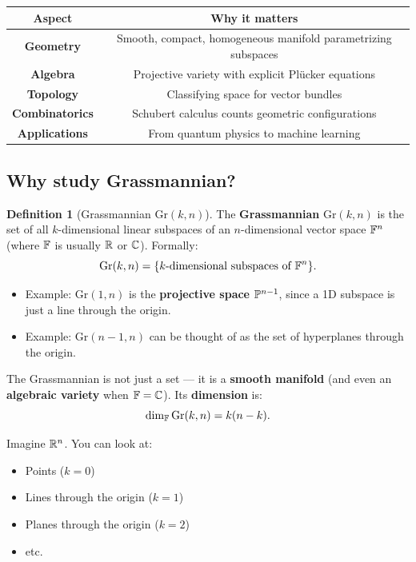 \documentclass{amsart}
\let\originalmathbb\mathbb
\renewcommand{\mathbb}[1]{%
    \ifstrequal{#1}{1}{\mathbbm{#1}}{\originalmathbb{#1}}%
}
\theoremstyle{plain}
\theoremstyle{definition}
\newtheorem{definition}[theorem]{Definition}
\theoremstyle{remark}
\begin{document}
\begin{table}[h]
	\centering
	\begin{tabular}{|c|c|}
		\hline
		Aspect & Why it matters \\
		\hline
		\textbf{Geometry} & Smooth, compact, homogeneous manifold parametrizing subspaces \\
		\hline
		\textbf{Algebra} & Projective variety with explicit Plücker equations \\
		\hline
		\textbf{Topology} & Classifying space for vector bundles \\
		\hline
		\textbf{Combinatorics} & Schubert calculus counts geometric configurations \\
		\hline
		\textbf{Applications} & From quantum physics to machine learning \\
		\hline
	\end{tabular}
\end{table}
\subsection{Why study Grassmannian?}

\begin{definition}[Grassmannian $\mathrm{Gr}(k, n)$]
The \textbf{Grassmannian} $\mathrm{Gr}(k, n)$ is the set of all $k$-dimensional linear subspaces of an $n$-dimensional vector space $\mathbb{F}^n$ (where $\mathbb{F}$ is usually $\mathbb{R}$ or $\mathbb{C}$).
Formally:
\[
\mathrm{Gr}(k, n) = \{ \text{\(k\)-dimensional subspaces of } \mathbb{F}^n \}.
\]	\begin{itemize}
		\item Example: $\mathrm{Gr}(1, n)$ is the \textbf{projective space} $\mathbb{P}^{n-1}$, since a 1D subspace is just a line through the origin.
		\item Example: $\mathrm{Gr}(n-1, n)$ can be thought of as the set of hyperplanes through the origin.
	\end{itemize}
The Grassmannian is not just a set — it is a \textbf{smooth manifold} (and even an \textbf{algebraic variety} when $\mathbb{F} = \mathbb{C}$).
Its \textbf{dimension} is:
\[
\dim_{\mathbb{F}} \mathrm{Gr}(k, n) = k(n-k).
\]
\end{definition}
Imagine $\mathbb{R}^n$. You can look at:

\begin{itemize}
	\item Points ($k=0$)
	\item Lines through the origin ($k=1$)
	\item Planes through the origin ($k=2$)
	\item etc.
\end{itemize}
\end{document}
